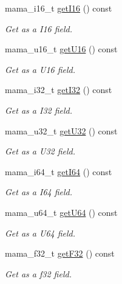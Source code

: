 \begin{DoxyCompactItemize}
mama\_\-i16\_\-t \hyperlink{classWombat_1_1MamaMsgField_ab8e896683ae8fb744072309b789f7af0}{getI16} () const 
\begin{DoxyCompactList}\small\item\em Get as a I16 field. \item\end{DoxyCompactList}\item 
mama\_\-u16\_\-t \hyperlink{classWombat_1_1MamaMsgField_a9b48adb151a0e50b5661e0cfd74be847}{getU16} () const 
\begin{DoxyCompactList}\small\item\em Get as a U16 field. \item\end{DoxyCompactList}\item 
mama\_\-i32\_\-t \hyperlink{classWombat_1_1MamaMsgField_a47107271fb9a9a9aa08c4a0619800462}{getI32} () const 
\begin{DoxyCompactList}\small\item\em Get as a I32 field. \item\end{DoxyCompactList}\item 
mama\_\-u32\_\-t \hyperlink{classWombat_1_1MamaMsgField_afe41c5a1eebf834ebf3743fc6566cd5a}{getU32} () const 
\begin{DoxyCompactList}\small\item\em Get as a U32 field. \item\end{DoxyCompactList}\item 
mama\_\-i64\_\-t \hyperlink{classWombat_1_1MamaMsgField_a41056ff06fd0510b8df0286b93c094ac}{getI64} () const 
\begin{DoxyCompactList}\small\item\em Get as a I64 field. \item\end{DoxyCompactList}\item 
mama\_\-u64\_\-t \hyperlink{classWombat_1_1MamaMsgField_a9f0c2b96b08d00bdcfbbd6e6f26450e3}{getU64} () const 
\begin{DoxyCompactList}\small\item\em Get as a U64 field. \item\end{DoxyCompactList}\item 
mama\_\-f32\_\-t \hyperlink{classWombat_1_1MamaMsgField_ac2644dee8474d59a6eefdf647640f0f0}{getF32} () const 
\begin{DoxyCompactList}\small\item\em Get as a f32 field. \item\end{DoxyCompactList}\item 

\end{DoxyCompactItemize}
